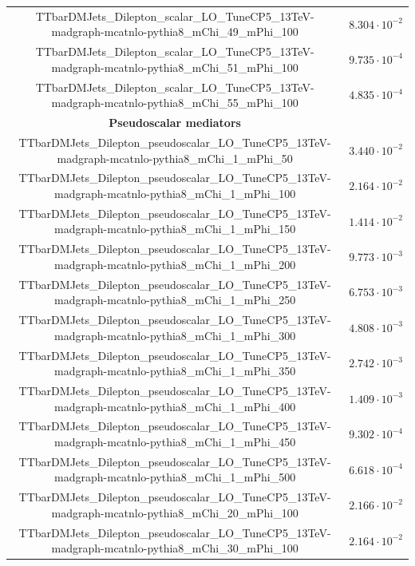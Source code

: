 \documentclass[a4paper, 10pt, openright]{report}
\begin{document}
\begin{appendices}
\begin{table}
\begin{center}
{\begin{tabular}{ c|c }
 TTbarDMJets\_Dilepton\_scalar\_LO\_TuneCP5\_13TeV-madgraph-mcatnlo-pythia8\_mChi\_49\_mPhi\_100 & $8.304 \cdot 10^{-2}$ \\
 TTbarDMJets\_Dilepton\_scalar\_LO\_TuneCP5\_13TeV-madgraph-mcatnlo-pythia8\_mChi\_51\_mPhi\_100 & $9.735 \cdot 10^{-4}$ \\
 TTbarDMJets\_Dilepton\_scalar\_LO\_TuneCP5\_13TeV-madgraph-mcatnlo-pythia8\_mChi\_55\_mPhi\_100 & $4.835 \cdot 10^{-4}$ \\
 \hline
\textbf{Pseudoscalar mediators} & \\
 TTbarDMJets\_Dilepton\_pseudoscalar\_LO\_TuneCP5\_13TeV-madgraph-mcatnlo-pythia8\_mChi\_1\_mPhi\_50 & $3.440 \cdot 10^{-2}$ \\
 TTbarDMJets\_Dilepton\_pseudoscalar\_LO\_TuneCP5\_13TeV-madgraph-mcatnlo-pythia8\_mChi\_1\_mPhi\_100 & $2.164 \cdot 10^{-2}$ \\
 TTbarDMJets\_Dilepton\_pseudoscalar\_LO\_TuneCP5\_13TeV-madgraph-mcatnlo-pythia8\_mChi\_1\_mPhi\_150 & $1.414 \cdot 10^{-2}$ \\
 TTbarDMJets\_Dilepton\_pseudoscalar\_LO\_TuneCP5\_13TeV-madgraph-mcatnlo-pythia8\_mChi\_1\_mPhi\_200 & $9.773 \cdot 10^{-3}$ \\
 TTbarDMJets\_Dilepton\_pseudoscalar\_LO\_TuneCP5\_13TeV-madgraph-mcatnlo-pythia8\_mChi\_1\_mPhi\_250 & $6.753 \cdot 10^{-3}$ \\
 TTbarDMJets\_Dilepton\_pseudoscalar\_LO\_TuneCP5\_13TeV-madgraph-mcatnlo-pythia8\_mChi\_1\_mPhi\_300 & $4.808 \cdot 10^{-3}$ \\
 TTbarDMJets\_Dilepton\_pseudoscalar\_LO\_TuneCP5\_13TeV-madgraph-mcatnlo-pythia8\_mChi\_1\_mPhi\_350 & $2.742 \cdot 10^{-3}$ \\
 TTbarDMJets\_Dilepton\_pseudoscalar\_LO\_TuneCP5\_13TeV-madgraph-mcatnlo-pythia8\_mChi\_1\_mPhi\_400 & $1.409 \cdot 10^{-3}$ \\
 TTbarDMJets\_Dilepton\_pseudoscalar\_LO\_TuneCP5\_13TeV-madgraph-mcatnlo-pythia8\_mChi\_1\_mPhi\_450 & $9.302 \cdot 10^{-4}$ \\
 TTbarDMJets\_Dilepton\_pseudoscalar\_LO\_TuneCP5\_13TeV-madgraph-mcatnlo-pythia8\_mChi\_1\_mPhi\_500 & $6.618 \cdot 10^{-4}$ \\
 TTbarDMJets\_Dilepton\_pseudoscalar\_LO\_TuneCP5\_13TeV-madgraph-mcatnlo-pythia8\_mChi\_20\_mPhi\_100 & $2.166 \cdot 10^{-2}$ \\
 TTbarDMJets\_Dilepton\_pseudoscalar\_LO\_TuneCP5\_13TeV-madgraph-mcatnlo-pythia8\_mChi\_30\_mPhi\_100 & $2.164 \cdot 10^{-2}$ \\

\end{tabular}}
\end{center}
\end{table}
\end{appendices}
\end{document}
